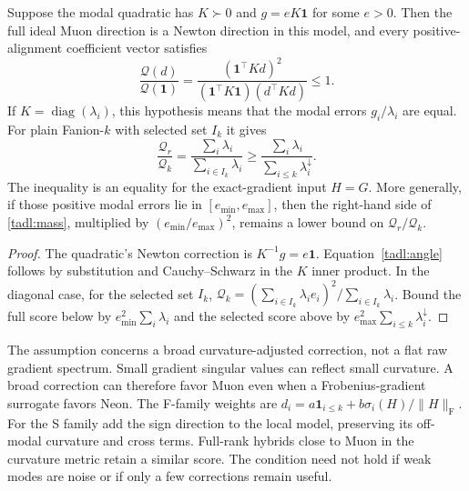 \begin{proposition}
\label{tadl:newton}
Suppose the modal quadratic has $K\succ0$ and $g=eK\boldsymbol1$ for
some $e>0$. Then the full ideal Muon direction is a Newton direction in
this model, and every positive-alignment coefficient vector satisfies
\begin{equation}\label{tadl:angle}
 \frac{\mathcal Q(d)}{\mathcal Q(\boldsymbol1)}
 =\frac{(\boldsymbol1^\top Kd)^2}
 {(\boldsymbol1^\top K\boldsymbol1)(d^\top Kd)}\leq1.
\end{equation}
If $K=\operatorname{diag}(\lambda_i)$, this hypothesis means that the
modal errors $g_i/\lambda_i$ are equal. For plain Fanion-$k$ with selected
set $I_k$ it gives
\begin{equation}\label{tadl:mass}
 \frac{\mathcal Q_r}{\mathcal Q_k}
 =\frac{\sum_i\lambda_i}{\sum_{i\in I_k}\lambda_i}
 \geq\frac{\sum_i\lambda_i}{\sum_{i\leq k}\lambda_i^{\downarrow}}.
\end{equation}
The inequality is an equality for the exact-gradient input $H=G$.
More generally, if those positive modal errors lie in
$[e_{\min},e_{\max}]$, then the right-hand side of
\eqref{tadl:mass}, multiplied by $(e_{\min}/e_{\max})^2$, remains a
lower bound on $\mathcal Q_r/\mathcal Q_k$.
\end{proposition}
\begin{proof}
The quadratic's Newton correction is $K^{-1}g=e\boldsymbol1$.
Equation~\eqref{tadl:angle} follows by substitution and Cauchy--Schwarz
in the $K$ inner product. In the diagonal case, for the selected set
$I_k$, $\mathcal Q_k=(\sum_{i\in I_k}\lambda_ie_i)^2/
\sum_{i\in I_k}\lambda_i$. Bound the full score below by
$e_{\min}^2\sum_i\lambda_i$ and the selected score above by
$e_{\max}^2\sum_{i\leq k}\lambda_i^{\downarrow}$.
\end{proof}

The assumption concerns a broad curvature-adjusted correction, not a flat
raw gradient spectrum. Small gradient singular values can reflect small
curvature. A broad correction can therefore favor Muon even when a
Frobenius-gradient surrogate favors Neon. The F-family weights are
$d_i=a\boldsymbol1_{i\leq k}+b\sigma_i(H)/\|H\|_{\mathrm F}$.
For the S family add the sign direction to the local model, preserving
its off-modal curvature and cross terms. Full-rank hybrids close to Muon
in the curvature metric retain a similar score. The condition need not
hold if weak modes are noise or if only a few corrections remain useful.

